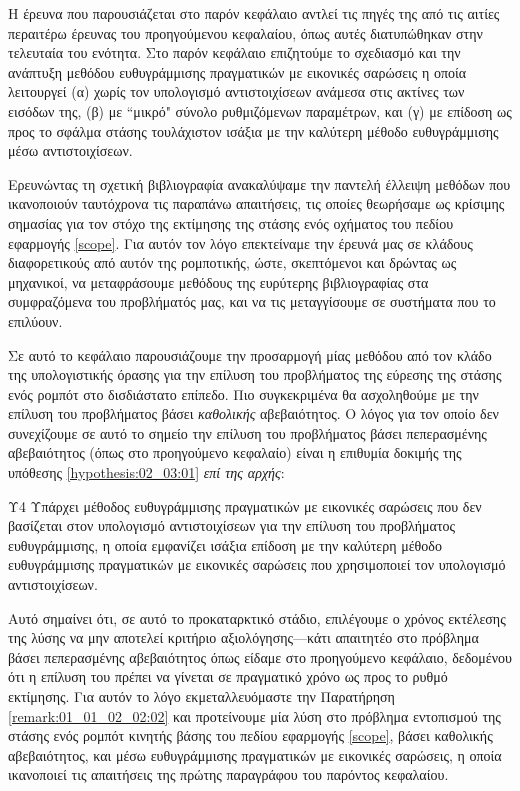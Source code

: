 Η έρευνα που παρουσιάζεται στο παρόν κεφάλαιο αντλεί τις πηγές της από τις
αιτίες περαιτέρω έρευνας του προηγούμενου κεφαλαίου, όπως αυτές διατυπώθηκαν
στην τελευταία του ενότητα. Στο παρόν κεφάλαιο επιζητούμε το σχεδιασμό και
την ανάπτυξη μεθόδου ευθυγράμμισης πραγματικών με εικονικές σαρώσεις η οποία
λειτουργεί (α) χωρίς τον υπολογισμό αντιστοιχίσεων ανάμεσα στις ακτίνες των
εισόδων της, (β) με ``μικρό" σύνολο ρυθμιζόμενων παραμέτρων, και (γ) με
επίδοση ως προς το σφάλμα στάσης τουλάχιστον ισάξια με την καλύτερη μέθοδο
ευθυγράμμισης μέσω αντιστοιχίσεων.

Ερευνώντας τη σχετική βιβλιογραφία ανακαλύψαμε την παντελή έλλειψη μεθόδων που
ικανοποιούν ταυτόχρονα τις παραπάνω απαιτήσεις, τις οποίες θεωρήσαμε ως
κρίσιμης σημασίας για τον στόχο της εκτίμησης της στάσης ενός οχήματος του
πεδίου εφαρμογής \ref{scope}. Για αυτόν τον λόγο επεκτείναμε την έρευνά μας σε
κλάδους διαφορετικούς από αυτόν της ρομποτικής, ώστε, σκεπτόμενοι και δρώντας
ως μηχανικοί, να μεταφράσουμε μεθόδους της ευρύτερης βιβλιογραφίας στα
συμφραζόμενα του προβλήματός μας, και να τις μεταγγίσουμε σε συστήματα που το
επιλύουν.

Σε αυτό το κεφάλαιο παρουσιάζουμε την προσαρμογή μίας μεθόδου από τον κλάδο της
υπολογιστικής όρασης για την επίλυση του προβλήματος της εύρεσης της στάσης
ενός ρομπότ στο δισδιάστατο επίπεδο. Πιο συγκεκριμένα θα ασχοληθούμε με την
επίλυση του προβλήματος βάσει \textit{καθολικής} αβεβαιότητος. Ο λόγος για τον
οποίο δεν συνεχίζουμε σε αυτό το σημείο την επίλυση του προβλήματος βάσει
πεπερασμένης αβεβαιότητος (όπως στο προηγούμενο κεφαλαίο) είναι η επιθυμία
δοκιμής της υπόθεσης \ref{hypothesis:02_03:01} \textit{επί της αρχής}:

\begin{customhypothesis}{Υ4}
\label{hypothesis:02_03:01}
  Υπάρχει μέθοδος ευθυγράμμισης πραγματικών με εικονικές σαρώσεις που δεν
  βασίζεται στον υπολογισμό αντιστοιχίσεων για την επίλυση του προβλήματος
  ευθυγράμμισης, η οποία εμφανίζει ισάξια επίδοση με την καλύτερη μέθοδο
  ευθυγράμμισης πραγματικών με εικονικές σαρώσεις που χρησιμοποιεί τον
  υπολογισμό αντιστοιχίσεων.
\end{customhypothesis}

Αυτό σημαίνει ότι, σε αυτό το προκαταρκτικό στάδιο, επιλέγουμε ο χρόνος
εκτέλεσης της λύσης να μην αποτελεί κριτήριο αξιολόγησης---κάτι απαιτητέο στο
πρόβλημα βάσει πεπερασμένης αβεβαιότητος όπως είδαμε στο προηγούμενο κεφάλαιο,
δεδομένου ότι η επίλυση του πρέπει να γίνεται σε πραγματικό χρόνο ως προς το
ρυθμό εκτίμησης. Για αυτόν το λόγο εκμεταλλευόμαστε την Παρατήρηση
\ref{remark:01_01_02_02:02} και προτείνουμε μία λύση στο πρόβλημα εντοπισμού
της στάσης ενός ρομπότ κινητής βάσης του πεδίου εφαρμογής \ref{scope}, βάσει
καθολικής αβεβαιότητος, και μέσω ευθυγράμμισης πραγματικών με εικονικές
σαρώσεις, η οποία ικανοποιεί τις απαιτήσεις της πρώτης παραγράφου του παρόντος
κεφαλαίου.

